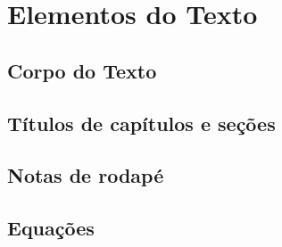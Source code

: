 \chapter[Elementos do Texto]{Elementos do Texto}

\section{Corpo do Texto}



\section{Títulos de capítulos e seções}


\section{Notas de rodapé}


\section{Equações}

